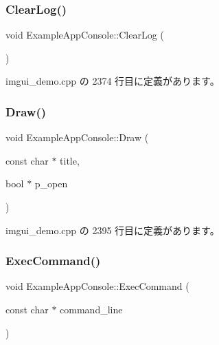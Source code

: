 \subsubsection{\texorpdfstring{Clear\+Log()}{ClearLog()}}
{\footnotesize\ttfamily void Example\+App\+Console\+::\+Clear\+Log (\begin{DoxyParamCaption}{ }\end{DoxyParamCaption})\hspace{0.3cm}{\ttfamily [inline]}}



 imgui\+\_\+demo.\+cpp の 2374 行目に定義があります。

\mbox{\label{struct_example_app_console_a0518a09c7e8648dd52c7c06df19ac17a}} 
\subsubsection{\texorpdfstring{Draw()}{Draw()}}
{\footnotesize\ttfamily void Example\+App\+Console\+::\+Draw (\begin{DoxyParamCaption}\item[{const char $\ast$}]{title,  }\item[{bool $\ast$}]{p\+\_\+open }\end{DoxyParamCaption})\hspace{0.3cm}{\ttfamily [inline]}}



 imgui\+\_\+demo.\+cpp の 2395 行目に定義があります。

\mbox{\label{struct_example_app_console_aa1e8bf1f3795cbc41597e1ff081c6589}} 
\subsubsection{\texorpdfstring{Exec\+Command()}{ExecCommand()}}
{\footnotesize\ttfamily void Example\+App\+Console\+::\+Exec\+Command (\begin{DoxyParamCaption}\item[{const char $\ast$}]{command\+\_\+line }\end{DoxyParamCaption})\hspace{0.3cm}{\ttfamily [inline]}}



